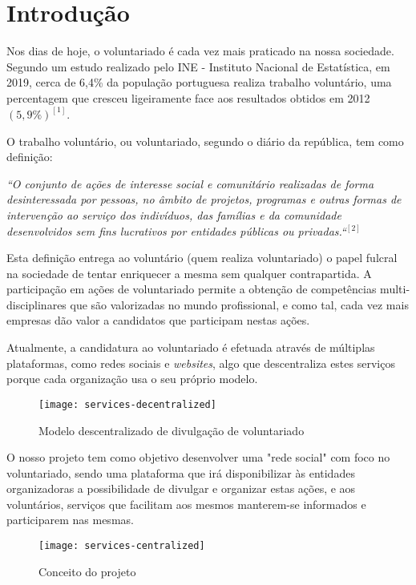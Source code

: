 \section{Introdução} \bigskip
Nos dias de hoje, o voluntariado é cada vez mais praticado na nossa sociedade. Segundo um estudo realizado pelo INE - Instituto Nacional de Estatística, em 2019, cerca de 6,4\% da população portuguesa realiza trabalho voluntário, uma percentagem que cresceu ligeiramente face aos resultados obtidos em 2012 $(5,9\%)^{[1]}$.
\par \bigskip

O trabalho voluntário, ou voluntariado, segundo o diário da república, tem como definição: \par \bigskip

\textit{
	``O conjunto de ações de interesse social e comunitário realizadas de forma desinteressada por pessoas, no âmbito de projetos, programas e outras formas de intervenção ao serviço dos indivíduos, das famílias e da comunidade desenvolvidos sem fins lucrativos por entidades públicas ou privadas.``$^{[2]}$
} \par \bigskip

Esta definição entrega ao voluntário (quem realiza voluntariado) o papel fulcral na sociedade de tentar enriquecer a mesma sem qualquer contrapartida. A participação em ações de voluntariado permite a obtenção de competências multi-disciplinares que são valorizadas no mundo profissional, e como tal, cada vez mais empresas dão valor a candidatos que participam nestas ações. \par \bigskip

Atualmente, a candidatura ao voluntariado é efetuada através de múltiplas plataformas, como redes sociais e \textit{websites}, algo que descentraliza estes serviços porque cada organização usa o seu próprio modelo.

\bigskip \bigskip \bigskip 

\begin{figure}[h]
	\centering
	\texttt{[image: services-decentralized]}
	\caption{Modelo descentralizado de divulgação de voluntariado}	
\end{figure}

\newpage

O nosso projeto tem como objetivo desenvolver uma "rede social" \space com foco no voluntariado, sendo uma plataforma que irá disponibilizar às entidades organizadoras a possibilidade de divulgar e organizar estas ações, e aos voluntários, serviços que facilitam aos mesmos manterem-se informados e participarem nas mesmas.

\bigskip \bigskip \bigskip

\begin{figure}[h]
	\centering
	\texttt{[image: services-centralized]}
	\caption{Conceito do projeto}
\end{figure}
